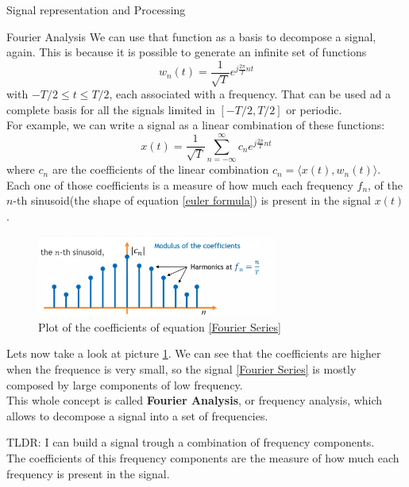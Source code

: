 \begin{section}{Signal representation and Processing}
\begin{subsection}{Fourier Analysis}
    We can use that function as a basis to decompose a signal, again. This is because it is 
    possible to generate an infinite set of functions
    \begin{equation}
      w_n(t) = \frac{1}{\sqrt{T}} e^{j\frac{2\pi}{T} nt} 
    \end{equation}
    with $-T/2 \leq t \leq T/2$, each associated with a frequency.
    That can be used ad a complete basis for all the signals limited in $[-T/2, T/2]$ or periodic.\\
    For example, we can write a signal as a linear combination of these functions:
    \begin{equation}
      x(t) = \frac{1}{\sqrt{T}} \sum_{n=-\infty}^{\infty} c_n e^{j\frac{2\pi}{T} nt}
      \label{Fourier Series}
    \end{equation}
    where $c_n$ are the coefficients of the linear combination $c_n = \langle x(t), w_n(t) \rangle$.\\
    Each one of those coefficients is a measure of how much each frequency $f_n$, of the $n$-th
    sinusoid(the shape of equation \ref{euler formula}) is present in the signal $x(t)$.\\
    \begin{figure}[h]
      \centering
      \includegraphics[width=0.7\textwidth]{img/euler plot.png}
      \caption{Plot of the coefficients of equation \ref{Fourier Series}}
      \label{fig:Fourier Analysis}
    \end{figure}
    Lets now take a look at picture \ref{fig:Fourier Analysis}. We can see that the coefficients
    are higher when the frequence is very small, so the signal \ref{Fourier Series} is mostly
    composed by large components of low frequency.\\
    This whole concept is called \textbf{Fourier Analysis}, or frequency analysis, which allows
    to decompose a signal into a set of frequencies.
    \begin{boxH}
    TLDR: I can build a signal trough a combination of frequency components. \\
    The coefficients of this frequency components are the measure of how much each frequency is 
    present in the signal.

\end{boxH}
\end{subsection}
\end{section}
